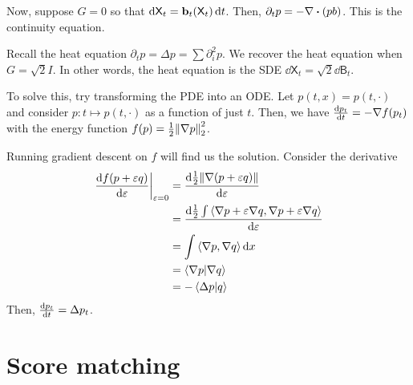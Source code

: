 \documentclass[notes]{agony}
\newcommand{\rv}{\mathsf}
\newcommand{\B}{\rv{B}}
\newcommand{\X}{\rv{X}}
\begin{document}
Now, suppose $G = 0$ so that $\dd{\X_t} = \vb b_t(\X_t)\dd{t}$.
Then, $\partial_t p = -\nabla \vdot (pb)$.
This is the continuity equation.

Recall the heat equation $\partial_t p = \Delta p = \sum \partial_i^2 p$.
We recover the heat equation when $G = \sqrt2 I$.
In other words, the heat equation is the SDE $\dd{\X_t} = \sqrt{2} \dd{\B_t}$.

To solve this, try transforming the PDE into an ODE.
Let $p(t,x) = p(t,\cdot)$ and consider $p : t \mapsto p(t,\cdot)$
as a function of just $t$.
Then, we have $\dv{p_t}{t} = -\nabla f(p_t)$
with the energy function $f(p) = \frac12\norm{\nabla p}_2^2$.

Running gradient descent on $f$ will find us the solution.
Consider the derivative
\begin{align*}
	\eval{\dv{f(p+\varepsilon q)}{\varepsilon}}_{\varepsilon=0}
	 & = \dv{\frac12\norm{\nabla(p+\varepsilon q)}}{\varepsilon}                                          \\
	 & = \dv{\frac12\int\ev{\nabla p + \varepsilon\nabla q, \nabla p + \varepsilon\nabla q}}{\varepsilon} \\
	 & = \int \ev{\nabla p,\nabla q} \dd{x}                                                               \\
	 & = \ip{\nabla p}{\nabla q}                                                                          \\
	 & = -\ip{\Delta p}{q}
\end{align*}
Then, $\dv{p_t}{t} = \Delta p_t$.

\section{Score matching}
\end{document}
